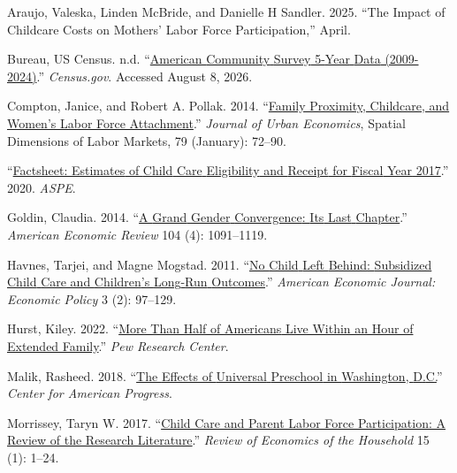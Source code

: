 \documentclass[
  letterpaper,
  DIV=11,
  numbers=noendperiod]{scrartcl}
\newlength{\cslhangindent}
\newenvironment{CSLReferences}[2] %
 {\begin{list}{}{%
  \setlength{\itemindent}{0pt}
  \setlength{\leftmargin}{0pt}
  \setlength{\parsep}{0pt}
  \ifodd #1
   \setlength{\leftmargin}{\cslhangindent}
   \setlength{\itemindent}{-1\cslhangindent}
  \fi
  \setlength{\itemsep}{#2\baselineskip}}}
 {\end{list}}
\begin{document}
\label{refs}
\begin{CSLReferences}{1}{0}
Araujo, Valeska, Linden McBride, and Danielle H Sandler. 2025. {``The
{Impact} of {Childcare} {Costs} on {Mothers}' {Labor} {Force}
{Participation},''} April.

Bureau, US Census. n.d.
{``\href{https://www.census.gov/data/developers/data-sets/acs-5year.html}{American
{Community} {Survey} 5-{Year} {Data} (2009-2024)}.''} \emph{Census.gov}.
Accessed August 8, 2026.

Compton, Janice, and Robert A. Pollak. 2014.
{``\href{https://doi.org/10.1016/j.jue.2013.03.007}{Family Proximity,
Childcare, and Women's Labor Force Attachment}.''} \emph{Journal of
Urban Economics}, Spatial {Dimensions} of {Labor} {Markets}, 79
(January): 72--90.

{``\href{http://aspe.hhs.gov/reports/factsheet-estimates-child-care-eligibility-receipt-fiscal-year-2017}{Factsheet:
{Estimates} of {Child} {Care} {Eligibility} and {Receipt} for {Fiscal}
{Year} 2017}.''} 2020. \emph{ASPE}.

Goldin, Claudia. 2014.
{``\href{https://doi.org/10.1257/aer.104.4.1091}{A {Grand} {Gender}
{Convergence}: {Its} {Last} {Chapter}}.''} \emph{American Economic
Review} 104 (4): 1091--1119.

Havnes, Tarjei, and Magne Mogstad. 2011.
{``\href{https://www.jstor.org/stable/41238095}{No {Child} {Left}
{Behind}: {Subsidized} {Child} {Care} and {Children}'s {Long}-{Run}
{Outcomes}}.''} \emph{American Economic Journal: Economic Policy} 3 (2):
97--129.

Hurst, Kiley. 2022.
{``\href{https://www.pewresearch.org/short-reads/2022/05/18/more-than-half-of-americans-live-within-an-hour-of-extended-family/}{More
Than Half of {Americans} Live Within an Hour of Extended Family}.''}
\emph{Pew Research Center}.

Malik, Rasheed. 2018.
{``\href{https://www.americanprogress.org/article/effects-universal-preschool-washington-d-c/}{The
{Effects} of {Universal} {Preschool} in {Washington}, {D}.{C}.}''}
\emph{Center for American Progress}.

Morrissey, Taryn W. 2017.
{``\href{https://doi.org/10.1007/s11150-016-9331-3}{Child Care and
Parent Labor Force Participation: A Review of the Research
Literature}.''} \emph{Review of Economics of the Household} 15 (1):
1--24.


\end{CSLReferences}
\end{document}

